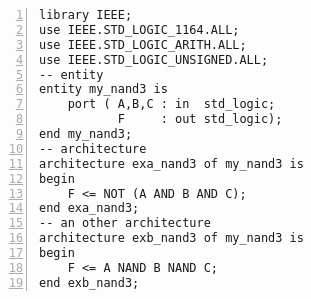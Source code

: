 \begin{minipage}{0.5\linewidth}
\begin{lstlisting}[numbers=left,label=example_1, caption=Solution of example 1.]
library IEEE;
use IEEE.STD_LOGIC_1164.ALL;
use IEEE.STD_LOGIC_ARITH.ALL;
use IEEE.STD_LOGIC_UNSIGNED.ALL;
-- entity
entity my_nand3 is
	port ( A,B,C : in  std_logic;
	       F     : out std_logic);
end my_nand3;
-- architecture
architecture exa_nand3 of my_nand3 is
begin
	F <= NOT (A AND B AND C);
end exa_nand3;
-- an other architecture
architecture exb_nand3 of my_nand3 is
begin
	F <= A NAND B NAND C;
end exb_nand3;
\end{lstlisting}
\end{minipage}
\begin{minipage}{0.4\linewidth}
\begin{flushright}
\end{flushright}
\end{minipage}

